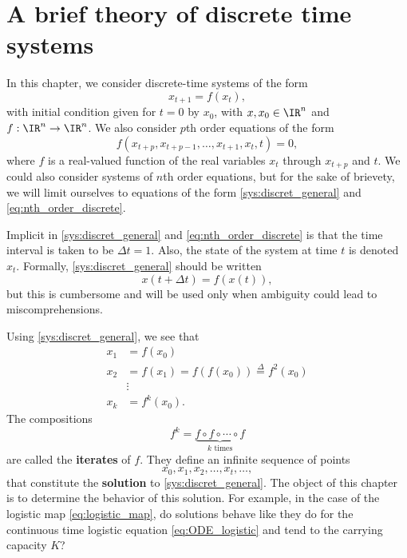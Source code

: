 \chapter{A brief theory of discrete time systems}
\label{chap:theory_discrete_time}

In this chapter, we consider discrete-time systems of the form
\begin{equation}\label{sys:discret_general}
x_{t+1}=f(x_t),
\end{equation}
with initial condition given for $t=0$ by $x_0$, with $x,x_0\in\IR^n$ and $f:\IR^n\to\IR^n$.
We also consider $p$th order equations of the form
\begin{equation}\label{eq:nth_order_discrete}
f(x_{t+p},x_{t+p-1},\dots,x_{t+1},x_t,t)=0,
\end{equation}
where $f$ is a real-valued function of the real variables $x_t$ through $x_{t+p}$ and $t$. We could also consider systems of $n$th order equations, but for the sake of brievety, we will limit ourselves to equations of the form \eqref{sys:discret_general} and \eqref{eq:nth_order_discrete}.

Implicit in \eqref{sys:discret_general} and \eqref{eq:nth_order_discrete} is that the time interval is taken to be $\Delta t=1$. Also, the state of the system at time $t$ is denoted $x_t$. Formally, \eqref{sys:discret_general} should be written
\[
x(t+\Delta t)=f(x(t)),
\]
but this is cumbersome and will be used only when ambiguity could lead to miscomprehensions.

Using \eqref{sys:discret_general}, we see that
\begin{align*}
x_1 &= f(x_0) \\
x_2 &= f(x_1)= f(f(x_0))\stackrel{\Delta}{=} f^2(x_0) \\
& \vdots \\
x_k &= f^k(x_0).
\end{align*}
The compositions
\[
f^k=\underbrace{f\circ f\circ\cdots\circ f}_{k\textrm{ times}}
\]
are called the \textbf{iterates} of $f$.
They define an infinite sequence of points
\[
x_0,x_1,x_2,\ldots,x_t,\ldots,
\]
that constitute the \textbf{solution} to \eqref{sys:discret_general}. The object of this chapter is to determine the behavior of this solution. For example, in the case of the logistic map \eqref{eq:logistic_map}, do solutions behave like they do for the continuous time logistic equation \eqref{eq:ODE_logistic} and tend to the carrying capacity $K$?


